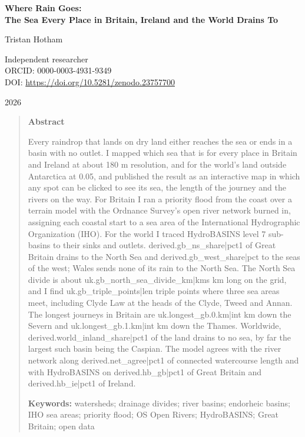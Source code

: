 \documentclass[11pt,a4paper]{article}
\begin{document}
\begin{center}
{\Large\bfseries Where Rain Goes:\\[2pt] The Sea Every Place in Britain, Ireland and the World Drains To\par}
\vspace{1.2em}
{\large Tristan Hotham\par}
\vspace{0.3em}
{\small Independent researcher\\
ORCID: 0000-0003-4931-9349\\
DOI: \href{https://doi.org/10.5281/zenodo.23757700}{https://doi.org/10.5281/zenodo.23757700}\par}
\vspace{0.8em}
2026
\end{center}

\begin{quote}
\small
\begin{center}\textbf{Abstract}\end{center}
Every raindrop that lands on dry land either reaches the sea or ends in a basin with no outlet. I mapped which sea that is for every place in Britain and Ireland at about 180 m resolution, and for the world's land outside Antarctica at 0.05\textdegree, and published the result as an interactive map in which any spot can be clicked to see its sea, the length of the journey and the rivers on the way. For Britain I ran a priority flood from the coast over a terrain model with the Ordnance Survey's open river network burned in, assigning each coastal start to a sea area of the International Hydrographic Organization (IHO). For the world I traced HydroBASINS level 7 sub-basins to their sinks and outlets. {{derived.gb_ns_share|pct1}} of Great Britain drains to the North Sea and {{derived.gb_west_share|pct}} to the seas of the west; Wales sends none of its rain to the North Sea. The North Sea divide is about {{uk.gb_north_sea_divide_km|kms}} km long on the grid, and I find {{uk.gb_triple_points|len}} triple points where three sea areas meet, including Clyde Law at the heads of the Clyde, Tweed and Annan. The longest journeys in Britain are {{uk.longest_gb.0.km|int}} km down the Severn and {{uk.longest_gb.1.km|int}} km down the Thames. Worldwide, {{derived.world_inland_share|pct1}} of the land drains to no sea, by far the largest such basin being the Caspian. The model agrees with the river network along {{derived.net_agree|pct1}} of connected watercourse length and with HydroBASINS on {{derived.hb_gb|pct1}} of Great Britain and {{derived.hb_ie|pct1}} of Ireland.

\textbf{Keywords:} watersheds; drainage divides; river basins; endorheic basins; IHO sea areas; priority flood; OS Open Rivers; HydroBASINS; Great Britain; open data
\end{quote}
\end{document}

